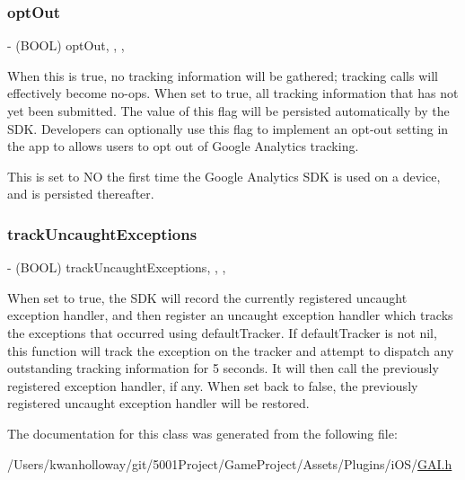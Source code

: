 \subsubsection{\texorpdfstring{opt\+Out}{optOut}}
{\footnotesize\ttfamily -\/ (B\+O\+OL) opt\+Out\hspace{0.3cm}{\ttfamily [read]}, {\ttfamily [write]}, {\ttfamily [nonatomic]}, {\ttfamily [assign]}}

When this is true, no tracking information will be gathered; tracking calls will effectively become no-\/ops. When set to true, all tracking information that has not yet been submitted. The value of this flag will be persisted automatically by the S\+DK. Developers can optionally use this flag to implement an opt-\/out setting in the app to allows users to opt out of Google Analytics tracking.

This is set to {\ttfamily NO} the first time the Google Analytics S\+DK is used on a device, and is persisted thereafter. \mbox{\label{interface_g_a_i_a016993f03870e97448f5ab23f9cb13a9}} 
\subsubsection{\texorpdfstring{track\+Uncaught\+Exceptions}{trackUncaughtExceptions}}
{\footnotesize\ttfamily -\/ (B\+O\+OL) track\+Uncaught\+Exceptions\hspace{0.3cm}{\ttfamily [read]}, {\ttfamily [write]}, {\ttfamily [nonatomic]}, {\ttfamily [assign]}}

When set to true, the S\+DK will record the currently registered uncaught exception handler, and then register an uncaught exception handler which tracks the exceptions that occurred using default\+Tracker. If default\+Tracker is not {\ttfamily nil}, this function will track the exception on the tracker and attempt to dispatch any outstanding tracking information for 5 seconds. It will then call the previously registered exception handler, if any. When set back to false, the previously registered uncaught exception handler will be restored. 

The documentation for this class was generated from the following file\+:\begin{DoxyCompactItemize}
\item 
/\+Users/kwanholloway/git/5001\+Project/\+Game\+Project/\+Assets/\+Plugins/i\+O\+S/\hyperlink{_g_a_i_8h}{G\+A\+I.\+h}\end{DoxyCompactItemize}
